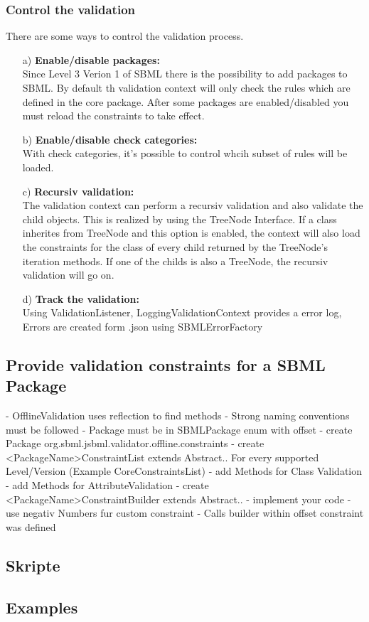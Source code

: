 \subsubsection{Control the validation}
There are some ways to control the validation process.
\begin{itemize}
\item[a)] \textbf{Enable/disable packages:}\\
Since Level 3 Verion 1 of SBML there is the possibility to add packages to SBML. By default th validation context will only check the rules which are defined in the core package. After some packages are enabled/disabled you must reload the constraints to take effect.
\item[b)] \textbf{Enable/disable check categories:}\\
With check categories, it's possible to control whcih subset of rules will be loaded.
\item[c)] \textbf{Recursiv validation:}\\
The validation context can perform a recursiv validation and also validate the child objects. This is realized by using the TreeNode Interface. If a class inherites from TreeNode and this option is enabled, the context will also load the constraints for the class of every child returned by the TreeNode's iteration methods. If one of the childs is also a TreeNode, the recursiv validation will go on.
\item[d)] \textbf{Track the validation:}\\
Using ValidationListener, LoggingValidationContext provides a error log, Errors are created form .json using SBMLErrorFactory
\end{itemize}


\subsection{Provide validation constraints for a SBML Package}
- OfflineValidation uses reflection to find methods
	- Strong naming conventions must be followed
- Package must be in SBMLPackage enum with offset
- create Package org.sbml.jsbml.validator.offline.constraints
- create <PackageName>ConstraintList extends Abstract.. For every supported Level/Version (Example CoreConstraintsList)
	- add Methods for Class Validation
	- add Methods for AttributeValidation
- create <PackageName>ConstraintBuilder extends Abstract..
- implement your code
- use negativ Numbers fur custom constraint
	- Calls builder within offset constraint was defined
	
\subsection{Skripte}

\subsection{Examples}